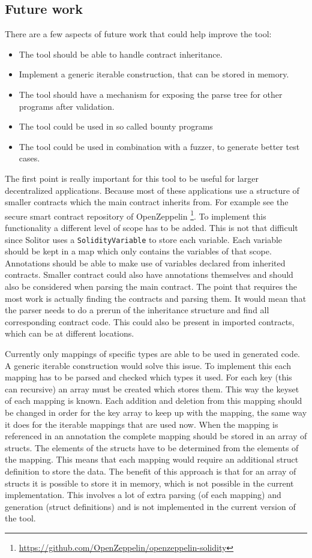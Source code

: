 \documentclass[a4paper]{article}
\begin{document}
\subsection{Future work}
There are a few aspects of future work that could help improve the tool:
\begin{itemize}
  \item The tool should be able to handle contract inheritance.
  \item Implement a generic iterable construction, that can be stored in memory.
  \item The tool should have a mechanism for exposing the parse tree for other programs after validation.
  \item The tool could be used in so called bounty programs
  \item The tool could be used in combination with a fuzzer, to generate better test cases.
\end{itemize}
The first point is really important for this tool to be useful for larger decentralized applications. Because most of these applications use a structure of smaller contracts which the main contract inherits from. For example see the secure smart contract repository of OpenZeppelin \footnote{\url{https://github.com/OpenZeppelin/openzeppelin-solidity}}. To implement this functionality a different level of scope has to be added. This is not that difficult since Solitor uses a \texttt{SolidityVariable} to store each variable. Each variable should be kept in a map which only contains the variables of that scope. Annotations should be able to make use of variables declared from inherited contracts. Smaller contract could also have annotations themselves and should also be considered when parsing the main contract. The point that requires the most work is actually finding the contracts and parsing them. It would mean that the parser needs to do a prerun of the inheritance structure and find all corresponding contract code. This could also be present in imported contracts, which can be at different locations.\par
Currently only mappings of specific types are able to be used in generated code. A generic iterable construction would solve this issue. To implement this each mapping has to be parsed and checked which types it used. For each key (this can recursive) an array must be created which stores them. This way the keyset of each mapping is known. Each addition and deletion from this mapping should be changed in order for the key array to keep up with the mapping, the same way it does for the iterable mappings that are used now. When the mapping is referenced in an annotation the complete mapping should be stored in an array of structs. The elements of the structs have to be determined from the elements of the mapping. This means that each mapping would require an additional struct definition to store the data. The benefit of this approach is that for an array of structs it is possible to store it in memory, which  is not possible in the current implementation. This involves a lot of extra parsing (of each mapping) and generation (struct definitions) and is not implemented in the current version of the tool. \par
\end{document}
